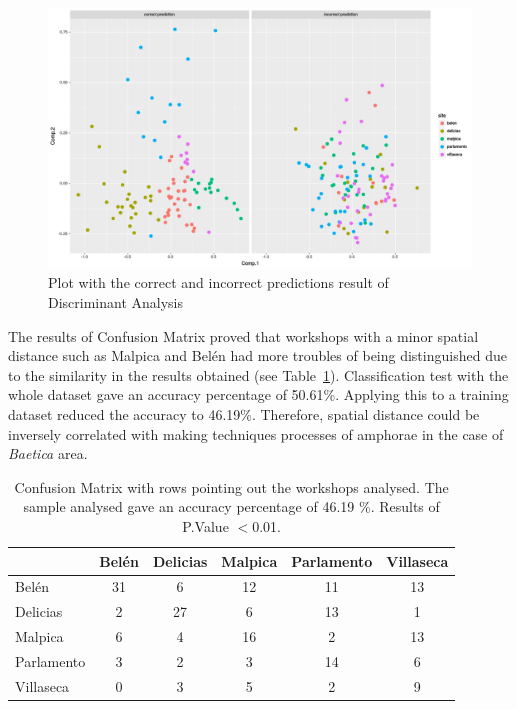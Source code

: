 \documentclass[review]{elsarticle}
\begin{document}
\begin{figure}[htp]
	\centering
\includegraphics[scale=0.35]{prediction.png}
\caption{Plot with the correct and incorrect predictions result of Discriminant Analysis}
\label{prediction}
\end{figure} 

The results of Confusion Matrix proved that workshops with a minor spatial distance such as Malpica and Bel\'en had more troubles of being distinguished due to the similarity in the results obtained (see Table~\ref{table:confusion}). Classification test with the whole dataset gave an accuracy percentage of 50.61\%. Applying this to a training dataset reduced the accuracy to 46.19\%. Therefore, spatial distance could be inversely correlated with making techniques processes of amphorae in the case of \textit{Baetica} area. 

\begin{table}[htp]
\begin{tabular}{lccccc}
\hline
      & Bel\'en & Delicias & Malpica & Parlamento & Villaseca\\ \hline
Bel\'en &   31  &      6   &   12    &     11     &   13 \\
Delicias&  2  &     27   &    6    &     13     &    1  \\
Malpica &  6  &      4   &   16    &      2     &   13   \\
Parlamento & 3&      2   &   3     &      14    &    6    \\
Villaseca  & 0&      3   &    5    &      2     &    9     \\
\hline

\end{tabular}
\caption{Confusion Matrix with rows pointing out the workshops analysed. The sample analysed gave an accuracy percentage of 46.19 $\%$. Results of P.Value $<$0.01. }
\label{table:confusion}
\end{table}
\end{document}
